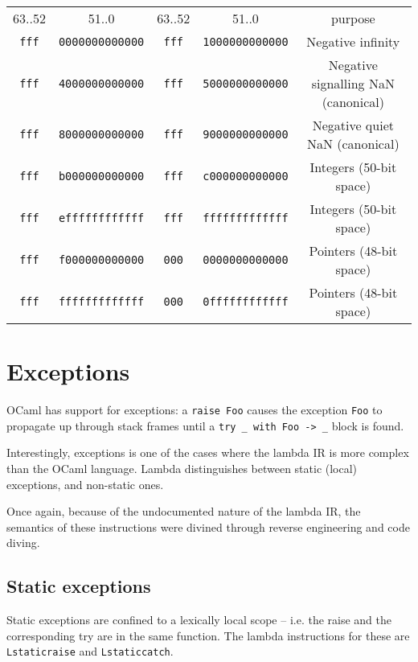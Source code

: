 \documentclass[12pt,a4paper,twoside,openright]{report}
\begin{document}
\begin{tabular}{c c | c c | c}
    63..52 & 51..0 & 63..52 & 51..0 & purpose \\
    \lstinline!fff! & \lstinline!0000000000000! & \lstinline!fff! & \lstinline!1000000000000! & Negative infinity \\
    \lstinline!fff! & \lstinline!4000000000000! & \lstinline!fff! & \lstinline!5000000000000! & Negative signalling NaN (canonical) \\
    \lstinline!fff! & \lstinline!8000000000000! & \lstinline!fff! & \lstinline!9000000000000! & Negative quiet NaN (canonical) \\
    \lstinline!fff! & \lstinline!b000000000000! & \lstinline!fff! & \lstinline!c000000000000! & Integers (50-bit space) \\
    \lstinline!fff! & \lstinline!effffffffffff! & \lstinline!fff! & \lstinline!fffffffffffff! & Integers (50-bit space) \\
    \lstinline!fff! & \lstinline!f000000000000! & \lstinline!000! & \lstinline!0000000000000! & Pointers (48-bit space) \\
    \lstinline!fff! & \lstinline!fffffffffffff! & \lstinline!000! & \lstinline!0ffffffffffff! & Pointers (48-bit space)
\end{tabular}



\section{Exceptions}

OCaml has support for exceptions: a \lstinline!raise Foo! causes the
exception \lstinline!Foo! to propagate up through stack frames until a
\lstinline!try _ with Foo -> _! block is found.

Interestingly, exceptions is one of the cases where the lambda IR is more
complex than the OCaml language. Lambda distinguishes between static (local)
exceptions, and non-static ones.

Once again, because of the undocumented nature of the lambda IR, the semantics
of these instructions were divined through reverse engineering and code diving.

\subsection{Static exceptions}

Static exceptions are confined to a lexically local scope -- i.e. the raise and
the corresponding try are in the same function. The lambda instructions for
these are \lstinline!Lstaticraise! and \lstinline!Lstaticcatch!.
\end{document}
